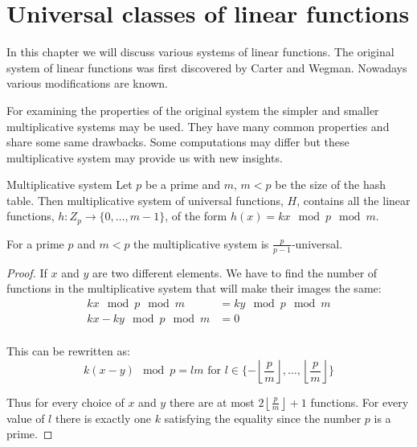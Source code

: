 \chapter {Universal classes of linear functions}

In this chapter we will discuss various systems of linear functions. The original system of linear functions was first discovered by Carter and Wegman. Nowadays various modifications are known.

For examining the properties of the original system the simpler and smaller multiplicative systems may be used. They have many common properties and share some same drawbacks. Some computations may differ but these multiplicative system may provide us with new insights.

\begin{definition}{Multiplicative system}
Let $p$ be a prime and $m$, $m < p$ be the size of the hash table. Then multiplicative system of universal functions, $H$, contains all the linear functions, $h:Z_p \rightarrow \lbrace 0, \dots, m - 1\rbrace$, of the form $h(x) = kx \mod p \mod m$. 
\end{definition}

\begin{theorem}
For a prime $p$ and $m < p$ the multiplicative system is $\frac{p}{p - 1}$-universal.
\end{theorem}
\begin{proof}
If $x$ and $y$ are two different elements. We have to find the number of functions in the multiplicative system that will make their images the same:
\begin{displaymath}
\begin{split}
kx \mod p \mod m & = ky \mod p \mod m \\
kx - ky \mod p \mod m & = 0 \\
\end{split}
\end{displaymath}

This can be rewritten as:
\begin{displaymath}
k(x - y) \mod p = l m \text{ for $l \in \lbrace -\left\lfloor\frac{p}{m}\right\rfloor, \dots, \left\lfloor\frac{p}{m}\right\rfloor \rbrace$}
\end{displaymath}

Thus for every choice of $x$ and $y$ there are at most $2\left\lfloor\frac{p}{m}\right\rfloor + 1$ functions. For every value of $l$ there is exactly one $k$ satisfying the equality since the number $p$ is a prime.
\end{proof}
